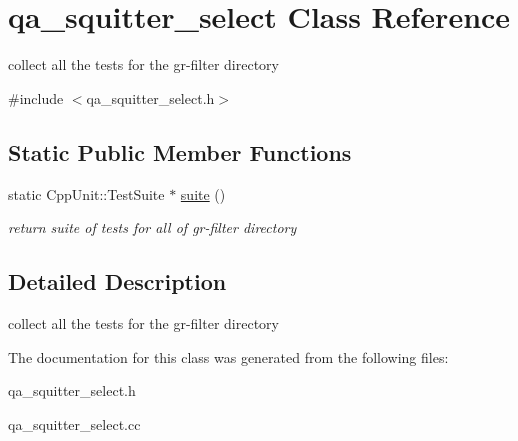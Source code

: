 \hypertarget{classqa__squitter__select}{}\section{qa\+\_\+squitter\+\_\+select Class Reference}
\label{classqa__squitter__select}


collect all the tests for the gr-\/filter directory  




{\ttfamily \#include $<$qa\+\_\+squitter\+\_\+select.\+h$>$}

\subsection*{Static Public Member Functions}
\begin{DoxyCompactItemize}
\item 
static Cpp\+Unit\+::\+Test\+Suite $\ast$ \hyperlink{classqa__squitter__select_a0f577a91ff587b225dea766670266871}{suite} ()\hypertarget{classqa__squitter__select_a0f577a91ff587b225dea766670266871}{}\label{classqa__squitter__select_a0f577a91ff587b225dea766670266871}

\begin{DoxyCompactList}\small\item\em return suite of tests for all of gr-\/filter directory \end{DoxyCompactList}\end{DoxyCompactItemize}


\subsection{Detailed Description}
collect all the tests for the gr-\/filter directory 

The documentation for this class was generated from the following files\+:\begin{DoxyCompactItemize}
\item 
qa\+\_\+squitter\+\_\+select.\+h\item 
qa\+\_\+squitter\+\_\+select.\+cc\end{DoxyCompactItemize}
